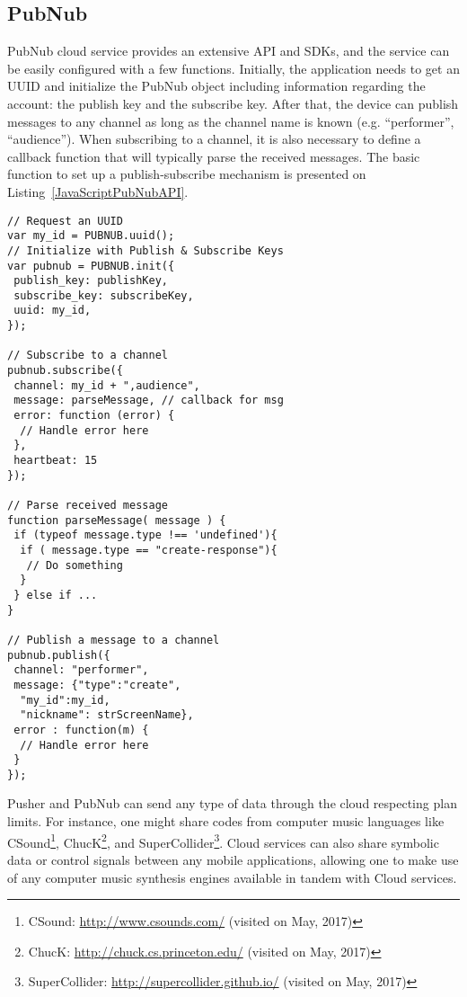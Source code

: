 \subsection*{PubNub}

PubNub cloud service provides an extensive API and SDKs, and the service can be easily configured with a few functions.
Initially, the application needs to get an UUID and initialize the PubNub object including information regarding the account: the publish key and the subscribe key.
After that, the device can publish messages to any channel as long as the channel name is known (e.g. ``performer'', ``audience'').
When subscribing to a channel, it is also necessary to define a callback function that will typically parse the received messages.
The basic function to set up a publish-subscribe mechanism is presented on Listing~\ref{JavaScriptPubNubAPI}.

\lstset{language=bash,  caption=Example of JavaScript code from PubNub API presented at audience page, captionpos=b, label=JavaScriptPubNubAPI, numbers=none, numberstyle=\scriptsize}

\begin{lstlisting}[frame=single, float=t]
// Request an UUID
var my_id = PUBNUB.uuid();
// Initialize with Publish & Subscribe Keys
var pubnub = PUBNUB.init({
 publish_key: publishKey,
 subscribe_key: subscribeKey,
 uuid: my_id,
});

// Subscribe to a channel
pubnub.subscribe({
 channel: my_id + ",audience",
 message: parseMessage, // callback for msg
 error: function (error) {
  // Handle error here
 },
 heartbeat: 15
});

// Parse received message
function parseMessage( message ) {
 if (typeof message.type !== 'undefined'){
  if ( message.type == "create-response"){
   // Do something
  }
 } else if ...
}

// Publish a message to a channel
pubnub.publish({
 channel: "performer",
 message: {"type":"create", 
  "my_id":my_id,
  "nickname": strScreenName},
 error : function(m) {
  // Handle error here
 }
});
\end{lstlisting}

Pusher and PubNub can send any type of data through the cloud respecting plan limits.
For instance, one might share codes from computer music languages like CSound\footnote{CSound: \url{http://www.csounds.com/} (visited on May, 2017)}, ChucK\footnote{ChucK: \url{http://chuck.cs.princeton.edu/} (visited on May, 2017)}, and SuperCollider\footnote{SuperCollider: \url{http://supercollider.github.io/} (visited on May, 2017)}.
Cloud services can also share symbolic data or control signals between any mobile applications, allowing one to make use of any computer music synthesis engines available in tandem with Cloud services.